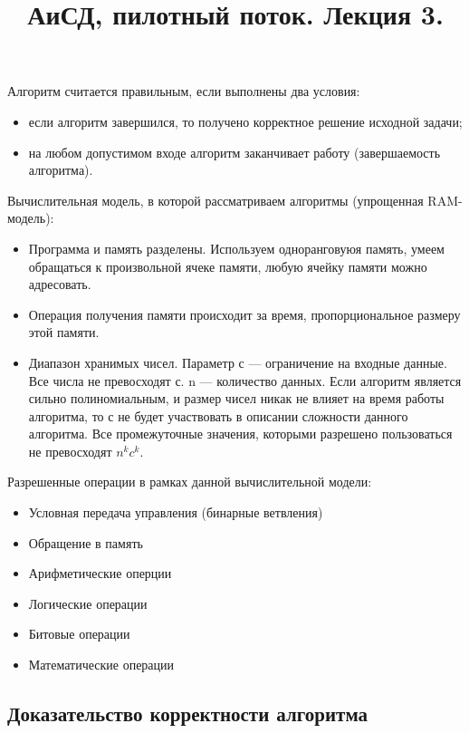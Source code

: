 \documentclass[a4paper, 12pt]{article}
\title{АиСД, пилотный поток. Лекция 3.}
\author{}
\date{}
\begin{document}
\lstset{numbers=left}
    \maketitle
        Алгоритм считается правильным, если выполнены два условия:
    \begin{itemize}
        \item если алгоритм завершился, то получено корректное решение исходной задачи;
        \item на любом допустимом входе алгоритм заканчивает работу (завершаемость алгоритма).
    \end{itemize}

Вычислительная модель, в которой рассматриваем алгоритмы (упрощенная RAM-модель):
\begin{itemize}
    \item Программа и память разделены. Используем одноранговуюя память, умеем обращаться к произвольной ячеке памяти, любую ячейку памяти можно адресовать.
    \item Операция получения памяти происходит за время, пропорциональное размеру этой памяти.
    \item Диапазон хранимых чисел. Параметр с --- ограничение на входные данные. Все числа не превосходят с. n --- количество данных.
Если алгоритм является сильно полиномиальным, и размер чисел никак не влияет на время работы алгоритма, то с не будет участвовать в описании сложности данного алгоритма.
Все промежуточные значения, которыми разрешено пользоваться не превосходят $n^kc^k$.
  \end{itemize}

Разрешенные операции в рамках данной вычислительной модели:
    \begin{itemize}
        \item Условная передача управления (бинарные ветвления)
        \item Обращение в память
        \item Арифметические оперции
        \item Логические операции
        \item Битовые операции
        \item Математические операции
    \end{itemize}

\subsection*{Доказательство корректности алгоритма}
\end{document}
